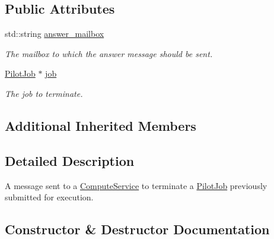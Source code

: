 \subsection*{Public Attributes}
\begin{DoxyCompactItemize}
\item 
\mbox{\label{classwrench_1_1_compute_service_terminate_pilot_job_request_message_ad4a4be726e0b373411ab2bea6106b6bc}} 
std\+::string \hyperlink{classwrench_1_1_compute_service_terminate_pilot_job_request_message_ad4a4be726e0b373411ab2bea6106b6bc}{answer\+\_\+mailbox}
\begin{DoxyCompactList}\small\item\em The mailbox to which the answer message should be sent. \end{DoxyCompactList}\item 
\mbox{\label{classwrench_1_1_compute_service_terminate_pilot_job_request_message_a77ed445925fcff91561ffd6eebe6796b}} 
\hyperlink{classwrench_1_1_pilot_job}{Pilot\+Job} $\ast$ \hyperlink{classwrench_1_1_compute_service_terminate_pilot_job_request_message_a77ed445925fcff91561ffd6eebe6796b}{job}
\begin{DoxyCompactList}\small\item\em The job to terminate. \end{DoxyCompactList}\end{DoxyCompactItemize}
\subsection*{Additional Inherited Members}


\subsection{Detailed Description}
A message sent to a \hyperlink{classwrench_1_1_compute_service}{Compute\+Service} to terminate a \hyperlink{classwrench_1_1_pilot_job}{Pilot\+Job} previously submitted for execution. 

\subsection{Constructor \& Destructor Documentation}
\mbox{\label{classwrench_1_1_compute_service_terminate_pilot_job_request_message_adb7dee68b8ac3adb23f9f756c5ca72cd}} 

